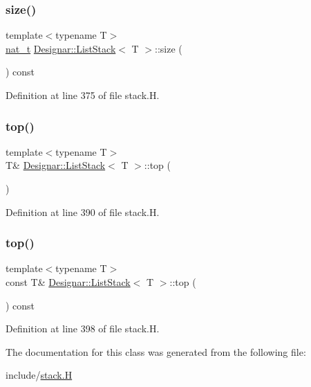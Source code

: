 \subsubsection{\texorpdfstring{size()}{size()}}
{\footnotesize\ttfamily template$<$typename T$>$ \\
\hyperlink{namespace_designar_aa72662848b9f4815e7bf31a7cf3e33d1}{nat\+\_\+t} \hyperlink{class_designar_1_1_list_stack}{Designar\+::\+List\+Stack}$<$ T $>$\+::size (\begin{DoxyParamCaption}{ }\end{DoxyParamCaption}) const\hspace{0.3cm}{\ttfamily [inline]}}



Definition at line 375 of file stack.\+H.

\mbox{\label{class_designar_1_1_list_stack_a5b6e47be80da93039d31cd885e97cf34}} 
\subsubsection{\texorpdfstring{top()}{top()}\hspace{0.1cm}{\footnotesize\ttfamily [1/2]}}
{\footnotesize\ttfamily template$<$typename T$>$ \\
T\& \hyperlink{class_designar_1_1_list_stack}{Designar\+::\+List\+Stack}$<$ T $>$\+::top (\begin{DoxyParamCaption}{ }\end{DoxyParamCaption})\hspace{0.3cm}{\ttfamily [inline]}}



Definition at line 390 of file stack.\+H.

\mbox{\label{class_designar_1_1_list_stack_a6eafdfa1a1a43b4cbbe27730a7dcffd3}} 
\subsubsection{\texorpdfstring{top()}{top()}\hspace{0.1cm}{\footnotesize\ttfamily [2/2]}}
{\footnotesize\ttfamily template$<$typename T$>$ \\
const T\& \hyperlink{class_designar_1_1_list_stack}{Designar\+::\+List\+Stack}$<$ T $>$\+::top (\begin{DoxyParamCaption}{ }\end{DoxyParamCaption}) const\hspace{0.3cm}{\ttfamily [inline]}}



Definition at line 398 of file stack.\+H.



The documentation for this class was generated from the following file\+:\begin{DoxyCompactItemize}
\item 
include/\hyperlink{stack_8_h}{stack.\+H}\end{DoxyCompactItemize}
